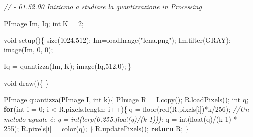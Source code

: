 \documentclass[
]{article}
\newenvironment{Shaded}{}{}
\newcommand{\CommentTok}[1]{\textcolor[rgb]{0.38,0.63,0.69}{\textit{#1}}}
\newcommand{\ControlFlowTok}[1]{\textcolor[rgb]{0.00,0.44,0.13}{\textbf{#1}}}
\newcommand{\DataTypeTok}[1]{\textcolor[rgb]{0.56,0.13,0.00}{#1}}
\newcommand{\DecValTok}[1]{\textcolor[rgb]{0.25,0.63,0.44}{#1}}
\newcommand{\FunctionTok}[1]{\textcolor[rgb]{0.02,0.16,0.49}{#1}}
\newcommand{\NormalTok}[1]{#1}
\newcommand{\OperatorTok}[1]{\textcolor[rgb]{0.40,0.40,0.40}{#1}}
\newcommand{\StringTok}[1]{\textcolor[rgb]{0.25,0.44,0.63}{#1}}
\begin{document}
\begin{Shaded}
\begin{Highlighting}[]
\CommentTok{// {-} 01.52.00 Iniziamo a studiare la quantizzazione in Processing}

\NormalTok{PImage Im}\OperatorTok{,}\NormalTok{ Iq}\OperatorTok{;}
\DataTypeTok{int}\NormalTok{ K }\OperatorTok{=} \DecValTok{2}\OperatorTok{;}

\DataTypeTok{void} \FunctionTok{setup}\OperatorTok{()\{}
  \FunctionTok{size}\OperatorTok{(}\DecValTok{1024}\OperatorTok{,}\DecValTok{512}\OperatorTok{);}
\NormalTok{  Im}\OperatorTok{=}\FunctionTok{loadImage}\OperatorTok{(}\StringTok{"lena.png"}\OperatorTok{);}
\NormalTok{  Im}\OperatorTok{.}\FunctionTok{filter}\OperatorTok{(}\NormalTok{GRAY}\OperatorTok{);}
  \FunctionTok{image}\OperatorTok{(}\NormalTok{Im}\OperatorTok{,} \DecValTok{0}\OperatorTok{,} \DecValTok{0}\OperatorTok{);}
  
\NormalTok{  Iq }\OperatorTok{=} \FunctionTok{quantizza}\OperatorTok{(}\NormalTok{Im}\OperatorTok{,}\NormalTok{ K}\OperatorTok{);}
  \FunctionTok{image}\OperatorTok{(}\NormalTok{Iq}\OperatorTok{,}\DecValTok{512}\OperatorTok{,}\DecValTok{0}\OperatorTok{);}
\OperatorTok{\}}

\DataTypeTok{void} \FunctionTok{draw}\OperatorTok{()\{}
\OperatorTok{\}}

\NormalTok{PImage }\FunctionTok{quantizza}\OperatorTok{(}\NormalTok{PImage I}\OperatorTok{,} \DataTypeTok{int}\NormalTok{ k}\OperatorTok{)\{}
\NormalTok{  PImage R }\OperatorTok{=}\NormalTok{ I}\OperatorTok{.}\FunctionTok{copy}\OperatorTok{();}
\NormalTok{  R}\OperatorTok{.}\FunctionTok{loadPixels}\OperatorTok{();}
  \DataTypeTok{int}\NormalTok{ q}\OperatorTok{;}
  \ControlFlowTok{for}\OperatorTok{(}\DataTypeTok{int}\NormalTok{ i }\OperatorTok{=} \DecValTok{0}\OperatorTok{;}\NormalTok{ i }\OperatorTok{\textless{}}\NormalTok{ R}\OperatorTok{.}\FunctionTok{pixels}\OperatorTok{.}\FunctionTok{length}\OperatorTok{;}\NormalTok{ i}\OperatorTok{++)\{}
\NormalTok{    q }\OperatorTok{=} \FunctionTok{floor}\OperatorTok{(}\FunctionTok{red}\OperatorTok{(}\NormalTok{R}\OperatorTok{.}\FunctionTok{pixels}\OperatorTok{[}\NormalTok{i}\OperatorTok{])*}\NormalTok{k}\OperatorTok{/}\DecValTok{256}\OperatorTok{);}
    \CommentTok{//Un metodo uguale è: q = int(lerp(0,255,float(q)/(k{-}1)));}
\NormalTok{    q }\OperatorTok{=} \DataTypeTok{int}\OperatorTok{(}\DataTypeTok{float}\OperatorTok{(}\NormalTok{q}\OperatorTok{)/(}\NormalTok{k}\OperatorTok{{-}}\DecValTok{1}\OperatorTok{)} \OperatorTok{*} \DecValTok{255}\OperatorTok{);}
\NormalTok{    R}\OperatorTok{.}\FunctionTok{pixels}\OperatorTok{[}\NormalTok{i}\OperatorTok{]} \OperatorTok{=} \FunctionTok{color}\OperatorTok{(}\NormalTok{q}\OperatorTok{);}
  \OperatorTok{\}}
\NormalTok{  R}\OperatorTok{.}\FunctionTok{updatePixels}\OperatorTok{();}
  \ControlFlowTok{return}\NormalTok{ R}\OperatorTok{;}
\OperatorTok{\}}


\end{Highlighting}
\end{Shaded}
\end{document}
